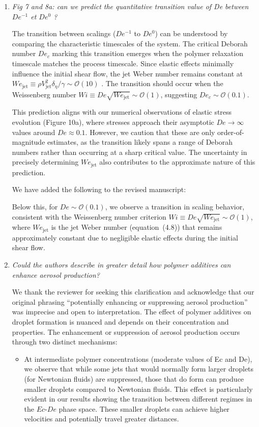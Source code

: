 \documentclass[]{article}
\newcommand{\oo}{\color{magenta} \normalfont}
\newcommand{\bb}{\color{black} \normalfont}
\begin{document}
\begin{enumerate}
    \item \textit{Fig 7 and 8a: can we predict the quantitative transition value of De between $De^{-1}$ et $De^0$ ?}

    The transition between scalings ($De^{-1}$ to $De^0$) can be understood by comparing the characteristic timescales of the system. The critical Deborah number $De_c$ marking this transition emerges when the polymer relaxation timescale matches the process timescale. Since elastic effects minimally influence the initial shear flow, the jet Weber number remains constant at $We_{\text{jet}} \equiv \rho V_{\text{jet}}^2 \delta_\eta/\gamma \sim \mathcal{O}(10)$ \citep{blanco2021jets}. The transition should occur when the Weissenberg number $Wi \equiv De\sqrt{We_{\text{jet}}} \sim \mathcal{O}(1)$, suggesting $De_c \sim \mathcal{O}(0.1)$.

    This prediction aligns with our numerical observations of elastic stress evolution (Figure 10a), where stresses approach their asymptotic $De \to \infty$ values around $De \approx 0.1$. However, we caution that these are only order-of-magnitude estimates, as the transition likely spans a range of Deborah numbers rather than occurring at a sharp critical value. The uncertainty in precisely determining $We_{\text{jet}}$ also contributes to the approximate nature of this prediction.


    We have added the following to the revised manuscript:

    \oo
    Below this, for $De \sim \mathcal{O}(0.1)$, we observe a transition in scaling behavior, consistent with the Weissenberg number criterion $Wi \equiv De\sqrt{We_{\text{jet}}} \sim \mathcal{O}(1)$, where $We_{\text{jet}}$ is the jet Weber number (equation~(4.8)) that remains approximately constant due to negligible elastic effects during the initial shear flow.
    \bb


    \item \textit{Could the authors describe in greater detail how polymer additives can enhance aerosol production?}

    We thank the reviewer for seeking this clarification and acknowledge that our original phrasing ``potentially enhancing or suppressing aerosol production'' was imprecise and open to interpretation. The effect of polymer additives on droplet formation is nuanced and depends on their concentration and properties. The enhancement or suppression of aerosol production occurs through two distinct mechanisms:

    \begin{itemize}
    	\item At intermediate polymer concentrations (moderate values of Ec and De), we observe that while some jets that would normally form larger droplets (for Newtonian fluids) are suppressed, those that do form can produce smaller droplets compared to Newtonian fluids. This effect is particularly evident in our results showing the transition between different regimes in the $Ec$-$De$ phase space. These smaller droplets can achieve higher velocities and potentially travel greater distances.


\end{itemize}
\end{enumerate}
\end{document}
